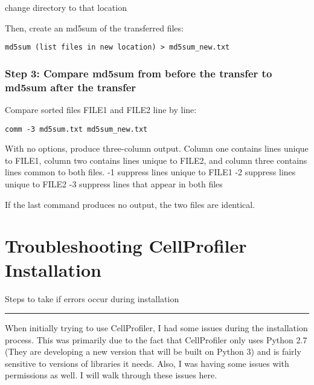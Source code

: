 \documentclass[
  letterpaper,
  DIV=11,
  numbers=noendperiod]{scrreprt}
\begin{document}
change directory to that location

Then, create an md5sum of the transferred files:

\texttt{md5sum\ (list\ files\ in\ new\ location)\ \textgreater{}\ md5sum\_new.txt}

\hypertarget{step-3-compare-md5sum-from-before-the-transfer-to-md5sum-after-the-transfer}{%
\subsection*{\texorpdfstring{\textbf{Step 3: Compare md5sum from before
the transfer to md5sum after the
transfer}}{Step 3: Compare md5sum from before the transfer to md5sum after the transfer}}\label{step-3-compare-md5sum-from-before-the-transfer-to-md5sum-after-the-transfer}}

Compare sorted files FILE1 and FILE2 line by line:

\texttt{comm\ -3\ md5sum.txt\ md5sum\_new.txt}

With no options, produce three-column output. Column one contains lines
unique to FILE1, column two contains lines unique to FILE2, and column
three contains lines common to both files. -1 suppress lines unique to
FILE1 -2 suppress lines unique to FILE2 -3 suppress lines that appear in
both files

If the last command produces no output, the two files are identical.

\hypertarget{troubleshooting-cellprofiler-installation}{%
\chapter{Troubleshooting CellProfiler
Installation}\label{troubleshooting-cellprofiler-installation}}

Steps to take if errors occur during installation

\begin{center}\rule{0.5\linewidth}{0.5pt}\end{center}

When initially trying to use CellProfiler, I had some issues during the
installation process. This was primarily due to the fact that
CellProfiler only uses Python 2.7 (They are developing a new version
that will be built on Python 3) and is fairly sensitive to versions of
libraries it needs. Also, I was having some issues with permissions as
well. I will walk through these issues here.
\end{document}
